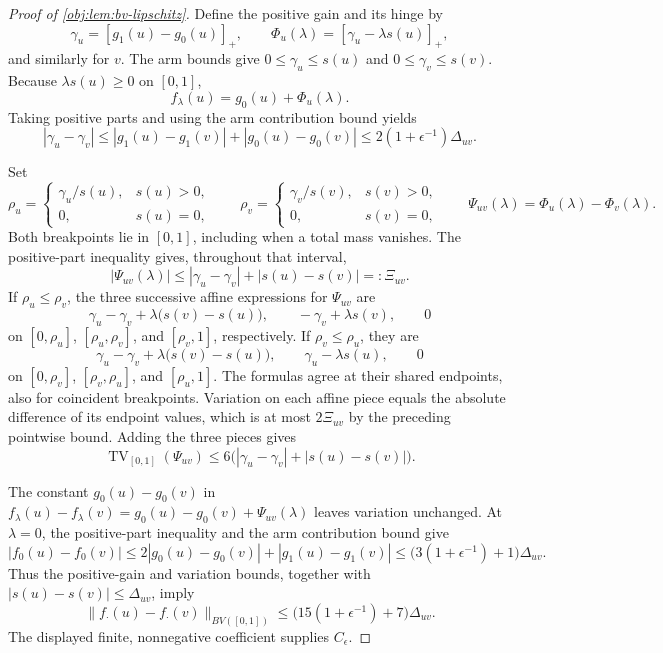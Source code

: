 \documentclass[11pt]{article}
\begin{document}
\begin{proof}[Proof of \cref{obj:lem:bv-lipschitz}]
Define the positive gain and its hinge by
\[
\gamma_u=[g_1(u)-g_0(u)]_+,\qquad
\Phi_u(\lambda)=[\gamma_u-\lambda s(u)]_+,
\]
and similarly for \(v\). The arm bounds give
\(0\leq\gamma_u\leq s(u)\) and \(0\leq\gamma_v\leq s(v)\).
Because \(\lambda s(u)\geq0\) on \([0,1]\),
\[
f_\lambda(u)=g_0(u)+\Phi_u(\lambda).
\]
Taking positive parts and using the arm contribution bound yields
\[
|\gamma_u-\gamma_v|
\leq |g_1(u)-g_1(v)|+|g_0(u)-g_0(v)|
\leq2(1+\epsilon^{-1})\Delta_{uv}.
\]

Set
\[
\rho_u=
\begin{cases}\gamma_u/s(u),&s(u)>0,\\0,&s(u)=0,\end{cases}
\qquad
\rho_v=
\begin{cases}\gamma_v/s(v),&s(v)>0,\\0,&s(v)=0,\end{cases}
\qquad
\Psi_{uv}(\lambda)=\Phi_u(\lambda)-\Phi_v(\lambda).
\]
Both breakpoints lie in \([0,1]\), including when a total mass vanishes. The positive-part inequality gives, throughout that interval,
\[
|\Psi_{uv}(\lambda)|
\leq |\gamma_u-\gamma_v|+|s(u)-s(v)|
=:\Xi_{uv}.
\]
If \(\rho_u\leq\rho_v\), the three successive affine expressions for
\(\Psi_{uv}\) are
\[
\gamma_u-\gamma_v+\lambda\bigl(s(v)-s(u)\bigr),\qquad
-\gamma_v+\lambda s(v),\qquad 0
\]
on \([0,\rho_u]\), \([\rho_u,\rho_v]\), and \([\rho_v,1]\), respectively.
If \(\rho_v\leq\rho_u\), they are
\[
\gamma_u-\gamma_v+\lambda\bigl(s(v)-s(u)\bigr),\qquad
\gamma_u-\lambda s(u),\qquad 0
\]
on \([0,\rho_v]\), \([\rho_v,\rho_u]\), and \([\rho_u,1]\).
The formulas agree at their shared endpoints, also for coincident breakpoints. Variation on each affine piece equals the absolute difference of its endpoint values, which is at most \(2\Xi_{uv}\) by the preceding pointwise bound. Adding the three pieces gives
\[
\operatorname{TV}_{[0,1]}(\Psi_{uv})
\leq6\bigl(|\gamma_u-\gamma_v|+|s(u)-s(v)|\bigr).
\]

The constant \(g_0(u)-g_0(v)\) in
\(f_\lambda(u)-f_\lambda(v)=g_0(u)-g_0(v)+\Psi_{uv}(\lambda)\)
leaves variation unchanged. At \(\lambda=0\), the positive-part inequality and the arm contribution bound give
\[
|f_0(u)-f_0(v)|
\leq 2|g_0(u)-g_0(v)|+|g_1(u)-g_1(v)|
\leq\bigl(3(1+\epsilon^{-1})+1\bigr)\Delta_{uv}.
\]
Thus the positive-gain and variation bounds, together with \(|s(u)-s(v)|\leq\Delta_{uv}\), imply
\[
\|f_{\cdot}(u)-f_{\cdot}(v)\|_{BV([0,1])}
\leq\bigl(15(1+\epsilon^{-1})+7\bigr)\Delta_{uv}.
\]
The displayed finite, nonnegative coefficient supplies \(C_\epsilon\).
\end{proof}
\end{document}

